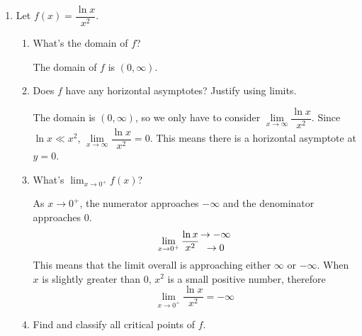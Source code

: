 \documentclass{article}
\begin{document}
\begin{enumerate}[resume]
\begin{enumerate}
  \end{enumerate}

\item 
  Let $f(x) = \dfrac{\ln x}{x^2}$.

  \begin{enumerate}
  \item
    \begin{problem}[0.35in]
      What's the domain of $f$?
    \end{problem}

    \begin{solution}
      The domain of $f$ is $(0, \infty)$. 
    \end{solution}

  \item
    \begin{problem}[0.65in]
      Does $f$ have any horizontal asymptotes? Justify using limits. 
    \end{problem}

    \begin{solution}
      The domain is $(0, \infty)$, so we only have to 
      consider $\lim\limits_{x \to \infty} \dfrac{\ln x}{x^2}$.
      Since $\ln x \ll x^2$, $\lim\limits_{x \to \infty} \dfrac{\ln x}{x^2}=0$. This means there is a horizontal asymptote at $y=0$.
    \end{solution}

  \item
    \begin{problem}[0.65in]
      What's $\displaystyle \lim_{x \to 0^+} f(x)$? 
    \end{problem}

    \begin{solution}
      As $x \to 0^+$, the numerator approaches $-\infty$ and
      the denominator approaches $0$.
      \[\lim_{x\to 0^+} \frac{\ln x}{x^2} \genfrac{}{}{0pt}{}{\to -\infty}{\to 0}\]
      This means that the limit overall is approaching either
      $\infty$ or $-\infty$. When $x$ is slightly greater than
      $0$, $x^2$ is a small positive number, therefore
      \[\lim_{x\to 0^+} \frac{\ln x}{x^2}=-\infty\]
    \end{solution}

  \item
    \begin{problem}[\vfill]
      Find and classify all critical points of $f$. 
    \end{problem}


\end{enumerate}
\end{enumerate}
\end{document}
